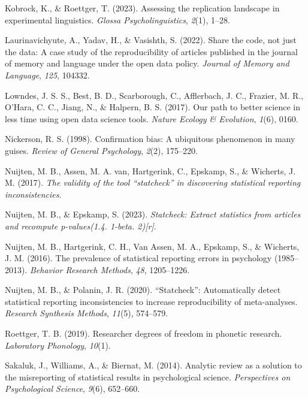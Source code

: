 \documentclass[
  doc,
  longtable,
  nolmodern,
  notxfonts,
  notimes,
  colorlinks=true,linkcolor=blue,citecolor=blue,urlcolor=blue]{apa7}
\newlength{\cslhangindent}
\newenvironment{CSLReferences}[2] %
 {\begin{list}{}{%
  \setlength{\itemindent}{0pt}
  \setlength{\leftmargin}{0pt}
  \setlength{\parsep}{0pt}
  \ifodd #1
   \setlength{\leftmargin}{\cslhangindent}
   \setlength{\itemindent}{-1\cslhangindent}
  \fi
  \setlength{\itemsep}{#2\baselineskip}}}
 {\end{list}}
\begin{document}
\begin{CSLReferences}{1}{0}
Kobrock, K., \& Roettger, T. (2023). Assessing the replication landscape
in experimental linguistics. \emph{Glossa Psycholinguistics},
\emph{2}(1), 1--28.

Laurinavichyute, A., Yadav, H., \& Vasishth, S. (2022). Share the code,
not just the data: A case study of the reproducibility of articles
published in the journal of memory and language under the open data
policy. \emph{Journal of Memory and Language}, \emph{125}, 104332.

Lowndes, J. S. S., Best, B. D., Scarborough, C., Afflerbach, J. C.,
Frazier, M. R., O'Hara, C. C., Jiang, N., \& Halpern, B. S. (2017). Our
path to better science in less time using open data science tools.
\emph{Nature Ecology \& Evolution}, \emph{1}(6), 0160.

Nickerson, R. S. (1998). Confirmation bias: A ubiquitous phenomenon in
many guises. \emph{Review of General Psychology}, \emph{2}(2), 175--220.

Nuijten, M. B., Assen, M. A. van, Hartgerink, C., Epskamp, S., \&
Wicherts, J. M. (2017). \emph{The validity of the tool {``statcheck''}
in discovering statistical reporting inconsistencies}.

Nuijten, M. B., \& Epskamp, S. (2023). \emph{Statcheck: Extract
statistics from articles and recompute p-values(1.4. 1-beta. 2){[}r{]}}.

Nuijten, M. B., Hartgerink, C. H., Van Assen, M. A., Epskamp, S., \&
Wicherts, J. M. (2016). The prevalence of statistical reporting errors
in psychology (1985--2013). \emph{Behavior Research Methods}, \emph{48},
1205--1226.

Nuijten, M. B., \& Polanin, J. R. (2020). {``Statcheck''}: Automatically
detect statistical reporting inconsistencies to increase reproducibility
of meta-analyses. \emph{Research Synthesis Methods}, \emph{11}(5),
574--579.

Roettger, T. B. (2019). Researcher degrees of freedom in phonetic
research. \emph{Laboratory Phonology}, \emph{10}(1).

Sakaluk, J., Williams, A., \& Biernat, M. (2014). Analytic review as a
solution to the misreporting of statistical results in psychological
science. \emph{Perspectives on Psychological Science}, \emph{9}(6),
652--660.


\end{CSLReferences}
\end{document}

